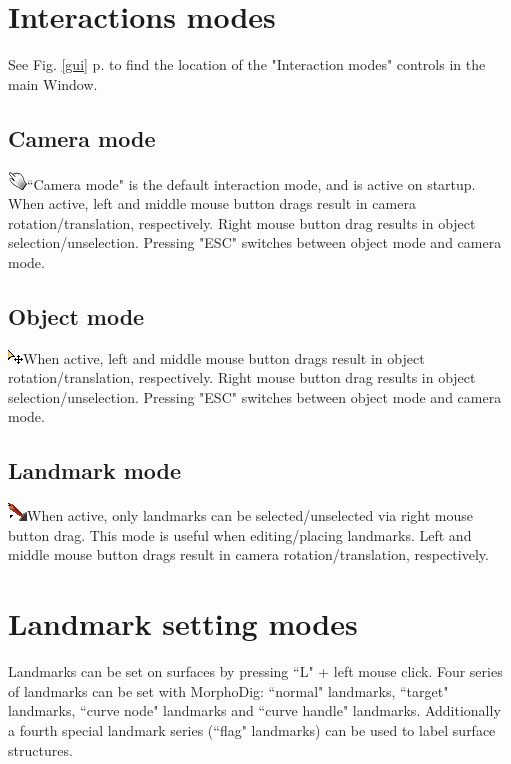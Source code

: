 \section{Interactions modes}

See Fig. \ref{gui} p.\pageref{gui} to find the location of the "Interaction modes" controls in the main Window.
\subsection{Camera mode}
  \includegraphics[scale=0.7]{images/04/camera_mode.png}``Camera mode" is the default interaction mode, and is active on startup. When active, left and middle mouse button drags result in camera rotation/translation, respectively. Right mouse button drag results in object selection/unselection. Pressing "ESC" switches between object mode and camera mode.
\subsection{Object mode}
   \includegraphics[scale=0.7]{images/04/move_mode.png}When active, left and middle mouse button drags result in object rotation/translation, respectively. Right mouse button drag results in object selection/unselection. Pressing "ESC" switches between object mode and camera mode.
\subsection{Landmark mode}
  \includegraphics[scale=0.7]{images/04/Landmarks2.png}When active, only landmarks can be selected/unselected via right mouse button drag. This mode is useful when editing/placing landmarks. Left and middle mouse button drags result in camera rotation/translation, respectively.

\section{Landmark setting modes}
Landmarks can be set on surfaces by pressing ``L" + left mouse click. 
Four series of landmarks can be set with MorphoDig: ``normal" landmarks, ``target" landmarks, ``curve node" landmarks and ``curve handle" landmarks. Additionally a fourth special landmark series (``flag" landmarks) can be used to label surface structures. 

